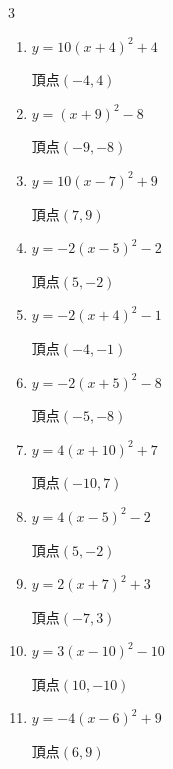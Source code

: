 \begin{multicols}{3}
\begin{enumerate}
        $\displaystyle 頂点\left( 4 , 6 \right)$

\columnbreak %

\resetques

  \item $\displaystyle y=10\left( x+4\right)^{2}+4$

        $\displaystyle 頂点\left( -4 , 4 \right)$

  \item $\displaystyle y=\left( x+9\right)^{2}-8$

        $\displaystyle 頂点\left( -9 , -8 \right)$

  \item $\displaystyle y=10\left( x-7\right)^{2}+9$

        $\displaystyle 頂点\left( 7 , 9 \right)$

  \item $\displaystyle y=-2\left( x-5\right)^{2}-2$

        $\displaystyle 頂点\left( 5 , -2 \right)$

  \item $\displaystyle y=-2\left( x+4\right)^{2}-1$

        $\displaystyle 頂点\left( -4 , -1 \right)$

  \item $\displaystyle y=-2\left( x+5\right)^{2}-8$

        $\displaystyle 頂点\left( -5 , -8 \right)$

  \item $\displaystyle y=4\left( x+10\right)^{2}+7$

        $\displaystyle 頂点\left( -10 , 7 \right)$

  \item $\displaystyle y=4\left( x-5\right)^{2}-2$

        $\displaystyle 頂点\left( 5 , -2 \right)$

  \item $\displaystyle y=2\left( x+7\right)^{2}+3$

        $\displaystyle 頂点\left( -7 , 3 \right)$

  \item $\displaystyle y=3\left( x-10\right)^{2}-10$

        $\displaystyle 頂点\left( 10 , -10 \right)$

  \item $\displaystyle y=-4\left( x-6\right)^{2}+9$

        $\displaystyle 頂点\left( 6 , 9 \right)$


\end{enumerate}
\end{multicols}
